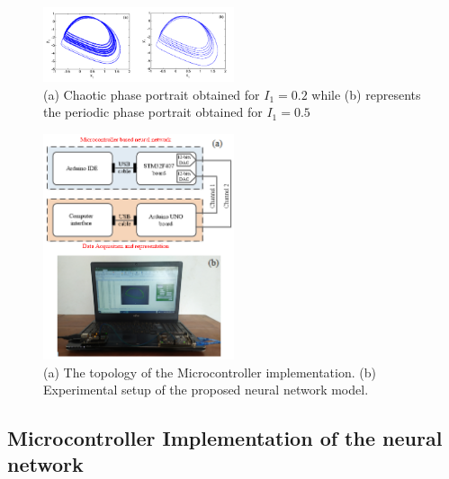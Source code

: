 \documentclass[journal]{IEEEtran/IEEEtran}
\begin{document}
\begin{figure}[!t]
	\centering
	\includegraphics[width=0.5\textwidth]{fig4.png}
		\caption{(a) Chaotic phase portrait obtained for $I_{1}=0.2$ while (b) represents the periodic phase portrait obtained for $I_{1}=0.5$}
	\label{fig4}
\end{figure}

\begin{figure}[!t]
	\centering
	\includegraphics[width=0.5\textwidth]{figg.png}
		\caption{(a) The topology of the Microcontroller implementation. (b) Experimental setup of the proposed neural network model.}
	\label{figg}
\end{figure}

\subsection{Microcontroller Implementation of the neural network}
\end{document}
